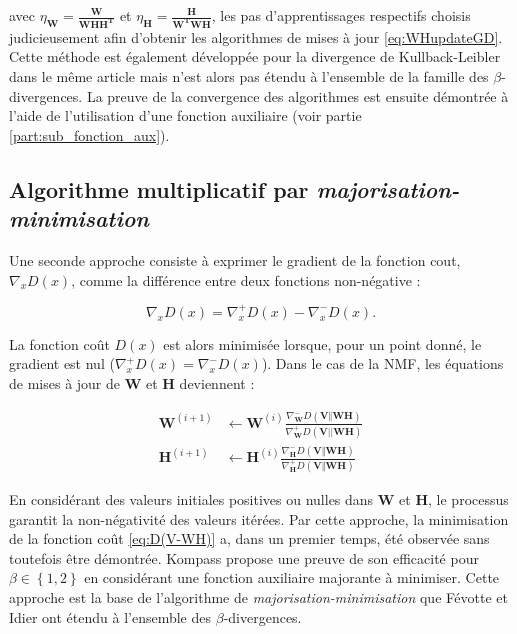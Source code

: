 avec $\eta_{\mathbf{W}} = \frac{\mathbf{W}}{\mathbf{WHH^T}}$ et $\eta_{\mathbf{H}} = \frac{\mathbf{H}}{\mathbf{W^TWH}}$, les pas d'apprentissages respectifs choisis judicieusement afin d'obtenir les algorithmes de mises à jour \ref{eq:WHupdateGD}. Cette méthode est également développée pour la divergence de Kullback-Leibler dans le même article mais n'est alors pas étendu à l'ensemble de la famille des $\beta$-divergences. La preuve de la convergence des algorithmes est ensuite démontrée à l'aide de l'utilisation d'une fonction auxiliaire (voir partie \ref{part:sub_fonction_aux}).


\subsection{Algorithme multiplicatif par \textit{majorisation-minimisation}}\label{part:majorisation-minimisation}
Une seconde approche \cite{cichocki2006csiszar} consiste à exprimer le gradient de la fonction cout, $\nabla_x D(x)$, comme la différence entre deux fonctions non-négative :

\begin{equation}
\nabla_x D(x) = \nabla_x^+ D(x) - \nabla_x^- D(x).
\end{equation}

La fonction coût $D(x)$ est alors minimisée lorsque, pour un point donné, le gradient est nul ($\nabla_x^+ D(x) = \nabla_x^- D(x)$). Dans le cas de la NMF, les équations de mises à jour de $\mathbf{W}$ et $\mathbf{H}$ deviennent :

\begin{subequations}
    \begin{align}
     \mathbf{W}^{(i+1)} & \leftarrow \mathbf{W}^{(i)}\frac{\nabla_\mathbf{W}^-D(\mathbf{V}\Vert\mathbf{WH})}{\nabla_\mathbf{W}^+D(\mathbf{V}\vert \vert \mathbf{WH})}\\
     \mathbf{H}^{(i+1)} & \leftarrow \mathbf{H}^{(i)}\frac{\nabla_\mathbf{H}^-D(\mathbf{V}\Vert\mathbf{WH})}{\nabla_\mathbf{H}^+D(\mathbf{V}\Vert\mathbf{WH})}
    \end{align}
\end{subequations}

En considérant des valeurs initiales positives ou nulles dans $\mathbf{W}$ et $\mathbf{H}$, le processus garantit la non-négativité des valeurs itérées. Par cette approche, la minimisation de la fonction coût \ref{eq:D(V-WH)} a, dans un premier temps, été observée sans toutefois être démontrée. Kompass \cite{kompass_generalized_2007} propose une preuve de son efficacité pour $\beta \in \left\lbrace1,2 \right\rbrace$ en considérant une fonction auxiliaire majorante à minimiser. Cette approche est la base de l'algorithme de \textit{majorisation-minimisation} que Févotte et Idier \cite{fevotte_algorithms_2011} ont étendu à l'ensemble des $\beta$-divergences.

